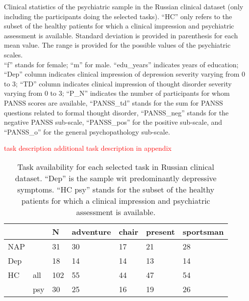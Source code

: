 \begin{table}[h]
\caption[Russian Clinical Dataset: Psychiatric Scores]{\label{tab:data:ru:sample:psy} Clinical statistics of the psychiatric sample in the Russian clinical dataset (only including the participants doing the selected tasks). ``HC'' only refers to the subset of the healthy patients for which a clinical impression and psychiatric assessment is available. Standard deviation is provided in parenthesis for each mean value. The range is provided for the possible values of the psychiatric scales. \\ ``f'' stands for female; ``m'' for male. ``edu\_years'' indicates years of education; ``Dep'' column indicates clinical impression of depression severity varying from 0 to 3; ``TD'' column indicates clinical impression of thought disorder severity varying from 0 to 3; ``P\_N'' indicates the number of participants for whom PANSS scores are available, ``PANSS\_td'' stands for the sum for PANSS questions related to formal thought disorder, ``PANSS\_neg'' stands for the negative PANSS sub-scale, ``PANSS\_pos'' for the positive sub-scale, and ``PANSS\_o'' for the general psychopathology sub-scale.}
\end{table}

\textcolor{red}{task description}
\textcolor{red}{additional task description in appendix}

\begin{table}[h!]
\begin{center}
\begin{tabular}{lllllll}
\hline
    &     & N   & adventure & chair & present & sportsman \\ \hline
NAP &     & 31  & 30        & 17    & 21      & 28        \\
Dep &     & 18  & 14        & 14    & 13      & 14        \\
HC  & all & 102 & 55        & 44    & 47      & 54        \\
    & psy & 30  & 25        & 16    & 19      & 26        \\ \hline
\end{tabular}
\captionsetup{width=\textwidth}
\caption[Russian Clinical Dataset: Task Availability]{\label{tab:data:ru:sample:tasks} Task availability for each selected task in Russian clinical dataset. ``Dep'' is the sample wit predominantly depressive symptoms. ``HC psy'' stands for the subset of the healthy patients for which a clinical impression and psychiatric assessment is available.}
\end{center}
\end{table}

